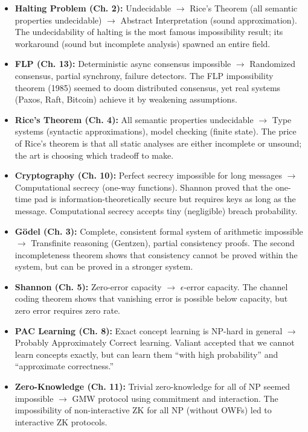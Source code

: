 \begin{itemize}
\item \textbf{Halting Problem (Ch. 2):} Undecidable $\to$ Rice's Theorem (all semantic properties undecidable) $\to$ Abstract Interpretation (sound approximation). The undecidability of halting is the most famous impossibility result; its workaround (sound but incomplete analysis) spawned an entire field.

\item \textbf{FLP (Ch. 13):} Deterministic async consensus impossible $\to$ Randomized consensus, partial synchrony, failure detectors. The FLP impossibility theorem (1985) seemed to doom distributed consensus, yet real systems (Paxos, Raft, Bitcoin) achieve it by weakening assumptions.

\item \textbf{Rice's Theorem (Ch. 4):} All semantic properties undecidable $\to$ Type systems (syntactic approximations), model checking (finite state). The price of Rice's theorem is that all static analyses are either incomplete or unsound; the art is choosing which tradeoff to make.

\item \textbf{Cryptography (Ch. 10):} Perfect secrecy impossible for long messages $\to$ Computational secrecy (one-way functions). Shannon proved that the one-time pad is information-theoretically secure but requires keys as long as the message. Computational secrecy accepts tiny (negligible) breach probability.

\item \textbf{G\"odel (Ch. 3):} Complete, consistent formal system of arithmetic impossible $\to$ Transfinite reasoning (Gentzen), partial consistency proofs. The second incompleteness theorem shows that consistency cannot be proved within the system, but can be proved in a stronger system.

\item \textbf{Shannon (Ch. 5):} Zero-error capacity $\to$ $\epsilon$-error capacity. The channel coding theorem shows that vanishing error is possible below capacity, but zero error requires zero rate.

\item \textbf{PAC Learning (Ch. 8):} Exact concept learning is NP-hard in general $\to$ Probably Approximately Correct learning. Valiant accepted that we cannot learn concepts exactly, but can learn them ``with high probability'' and ``approximate correctness.''

\item \textbf{Zero-Knowledge (Ch. 11):} Trivial zero-knowledge for all of NP seemed impossible $\to$ GMW protocol using commitment and interaction. The impossibility of non-interactive ZK for all NP (without OWFs) led to interactive ZK protocols.


\end{itemize}

